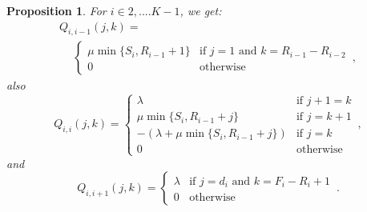 \documentclass[conference]{IEEEtran}
\newtheorem{prosi}{Proposition}
\begin{document}
\begin{prosi}
For $i \in {2,....K-1}$, we get:
\begin{multline*}
Q_{i,i-1}(j,k)= \\
\quad \ 
\begin{cases}
\mu \min\{S_{i},R_{i-1}\!+\!1\}  & \text{if } j= \! 1 \text{ and } k= \! R_{i-1} \! - \! R_{i-2}\\
0 & \text{otherwise}
\end{cases}\, ,
\end{multline*}
also
\begin{equation*}
Q_{i,i}(j,k) = 
\begin{cases}
\lambda                                 & \text{if } j+1=k\\
\mu \min\{S_{i},R_{i-1}+j\}             & \mbox{if } j=k+1\\
-(\lambda+\mu \min\{S_{i},R_{i-1}+j\})  & \text{if } j=k\\
0                                       & \text{otherwise}
\end{cases}\, ,
\end{equation*}
and
\begin{equation*}
Q_{i,i+1}(j,k) = 
\begin{cases}
\lambda             & \text{if } j=d_{i} \text{ and } k=F_{i}-R_{i}+1\\
0                   & \mbox{otherwise}
\end{cases}\, .
\end{equation*}


\end{prosi}
\end{document}
